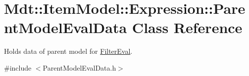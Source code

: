\hypertarget{class_mdt_1_1_item_model_1_1_expression_1_1_parent_model_eval_data}{}\section{Mdt\+:\+:Item\+Model\+:\+:Expression\+:\+:Parent\+Model\+Eval\+Data Class Reference}
\label{class_mdt_1_1_item_model_1_1_expression_1_1_parent_model_eval_data}


Holds data of parent model for \hyperlink{struct_mdt_1_1_item_model_1_1_expression_1_1_filter_eval}{Filter\+Eval}.  




{\ttfamily \#include $<$Parent\+Model\+Eval\+Data.\+h$>$}

